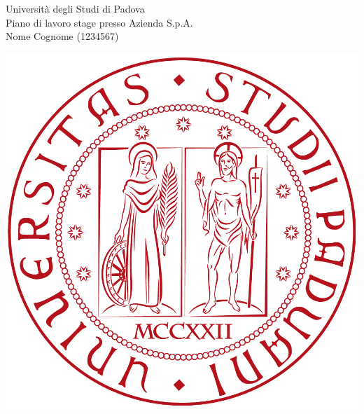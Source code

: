 \documentclass[11pt,notitlepage]{article}
\newcommand{\nomeStudente}{Nome}
\newcommand{\cognomeStudente}{Cognome}
\newcommand{\matricolaStudente}{1234567}
\newcommand{\ragioneSocAzienda}{Azienda S.p.A.}
\begin{document}
\noindent
\parbox{0.7\columnwidth}{Università degli Studi di Padova\\
	Piano di lavoro stage presso \ragioneSocAzienda{}\\
	\nomeStudente{} \cognomeStudente{} (\matricolaStudente{})}%
\parbox{0.3\columnwidth}{
	\hfill \includegraphics[scale=0.08]{immagini/logo-unipd.png}}
\end{document}
